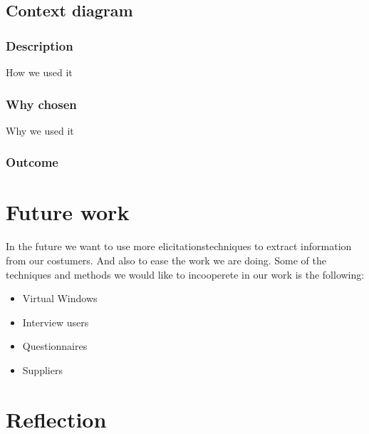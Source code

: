 \documentclass[a4paper]{article}
\begin{document}
    \subsection{Context diagram} \label{subsec:context}


    \subsubsection{Description}
    How we used it
    \subsubsection{Why chosen}
    Why we used it
    \subsubsection{Outcome}

  \section{Future work}

  In the future we want to use more elicitationstechniques to extract information from our costumers. And also to ease the work we are doing.
  Some of the techniques and methods we would like to incooperete in our work is the following:
  \begin{itemize}
  	\item Virtual Windows
  	\item Interview users
  	\item Questionnaires
  	\item Suppliers 
  \end{itemize}
 
  \section{Reflection}


\end{document}
